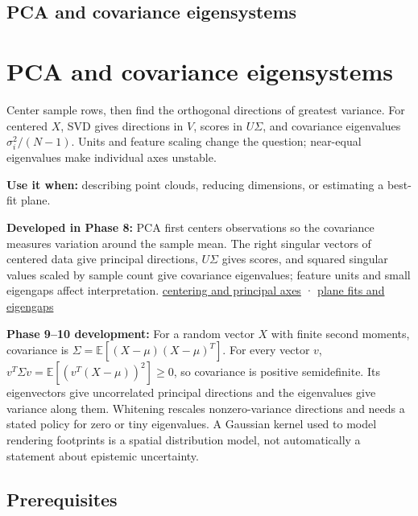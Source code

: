 \hypertarget{appendix-ad175ef3c5bf}{}
\section*{PCA and covariance eigensystems}
\chapter{PCA and covariance eigensystems}\label{appendix-ad175ef3c5bf-pca-and-covariance-eigensystems}

Center sample rows, then find the orthogonal directions of greatest variance. For centered \(X\), SVD gives directions in \(V\), scores in \(U\Sigma\), and covariance eigenvalues \(\sigma_i^2/(N-1)\). Units and feature scaling change the question; near-equal eigenvalues make individual axes unstable.

\textbf{Use it when:} describing point clouds, reducing dimensions, or estimating a best-fit plane.

\textbf{Developed in Phase 8:} PCA first centers observations so the covariance measures variation around the sample mean. The right singular vectors of centered data give principal directions, \(U\Sigma\) gives scores, and squared singular values scaled by sample count give covariance eigenvalues; feature units and small eigengaps affect interpretation. \href{Continuous\%20Notes/Computing\%20Foundations\%20-\%20From\%20Bits\%20to\%20C++\%20and\%20Systems\%20APIs\#Centered\%20measurements\%20reveal\%20principal\%20directions}{centering and principal axes} · \href{Continuous\%20Notes/Computing\%20Foundations\%20-\%20From\%20Bits\%20to\%20C++\%20and\%20Systems\%20APIs\#Plane\%20fits,\%20eigengaps,\%20and\%20interpretation\%20of\%20uncertain\%20components}{plane fits and eigengaps}

\textbf{Phase 9--10 development:} For a random vector \(X\) with finite second moments, covariance is \(\Sigma=\mathbb E[(X-\mu)(X-\mu)^T]\). For every vector \(v\), \(v^T\Sigma v=\mathbb E[(v^T(X-\mu))^2]\geq0\), so covariance is positive semidefinite. Its eigenvectors give uncorrelated principal directions and the eigenvalues give variance along them. Whitening rescales nonzero-variance directions and needs a stated policy for zero or tiny eigenvalues. A Gaussian kernel used to model rendering footprints is a spatial distribution model, not automatically a statement about epistemic uncertainty.

\section{Prerequisites}\label{appendix-ad175ef3c5bf-prerequisites}

